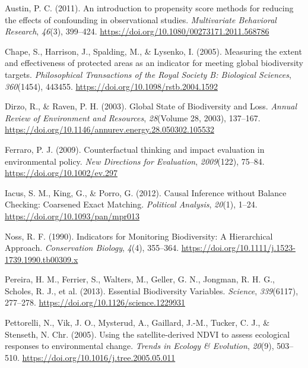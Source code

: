 \documentclass[
]{agujournal2019}
\newlength{\cslhangindent}
\newenvironment{CSLReferences}[2] %
 {\begin{list}{}{%
  \setlength{\itemindent}{0pt}
  \setlength{\leftmargin}{0pt}
  \setlength{\parsep}{0pt}
  \ifodd #1
   \setlength{\leftmargin}{\cslhangindent}
   \setlength{\itemindent}{-1\cslhangindent}
  \fi
  \setlength{\itemsep}{#2\baselineskip}}}
 {\end{list}}
\begin{document}
\label{refs}
\begin{CSLReferences}{1}{0}
\vspace{1em}

Austin, P. C. (2011). An introduction to propensity score methods for
reducing the effects of confounding in observational studies.
\emph{Multivariate Behavioral Research}, \emph{46}(3), 399--424.
\url{https://doi.org/10.1080/00273171.2011.568786}

Chape, S., Harrison, J., Spalding, M., \& Lysenko, I. (2005). Measuring
the extent and effectiveness of protected areas as an indicator for
meeting global biodiversity targets. \emph{Philosophical Transactions of
the Royal Society B: Biological Sciences}, \emph{360}(1454), 443455.
\url{https://doi.org/10.1098/rstb.2004.1592}

Dirzo, R., \& Raven, P. H. (2003). Global State of Biodiversity and
Loss. \emph{Annual Review of Environment and Resources},
\emph{28}(Volume 28, 2003), 137--167.
\url{https://doi.org/10.1146/annurev.energy.28.050302.105532}

Ferraro, P. J. (2009). Counterfactual thinking and impact evaluation in
environmental policy. \emph{New Directions for Evaluation},
\emph{2009}(122), 75--84. \url{https://doi.org/10.1002/ev.297}

Iacus, S. M., King, G., \& Porro, G. (2012). Causal Inference without
Balance Checking: Coarsened Exact Matching. \emph{Political Analysis},
\emph{20}(1), 1--24. \url{https://doi.org/10.1093/pan/mpr013}

Noss, R. F. (1990). Indicators for Monitoring Biodiversity: A
Hierarchical Approach. \emph{Conservation Biology}, \emph{4}(4),
355--364. \url{https://doi.org/10.1111/j.1523-1739.1990.tb00309.x}

Pereira, H. M., Ferrier, S., Walters, M., Geller, G. N., Jongman, R. H.
G., Scholes, R. J., et al. (2013). Essential Biodiversity Variables.
\emph{Science}, \emph{339}(6117), 277--278.
\url{https://doi.org/10.1126/science.1229931}

Pettorelli, N., Vik, J. O., Mysterud, A., Gaillard, J.-M., Tucker, C.
J., \& Stenseth, N. Chr. (2005). Using the satellite-derived NDVI to
assess ecological responses to environmental change. \emph{Trends in
Ecology \& Evolution}, \emph{20}(9), 503--510.
\url{https://doi.org/10.1016/j.tree.2005.05.011}


\end{CSLReferences}
\end{document}
